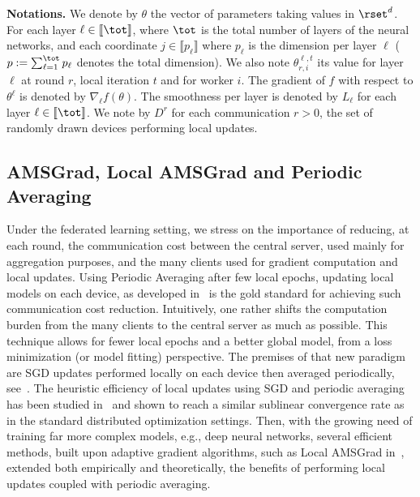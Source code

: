 \documentclass[twoside]{article}
\begin{document}
\noindent\textbf{Notations.} We denote by $\theta$ the vector of parameters taking values in $\rset^d$. 
For each layer $\ell \in \llbracket \tot \rrbracket$, where $\tot$ is the total number of layers of the neural networks, and each coordinate $j \in \llbracket p_\ell \rrbracket$ where $p_\ell$ is the dimension per layer $\ell$ ($p := \sum_{\ell=1}^\tot p_\ell$ denotes the total dimension).
We also note $\theta_{r,i}^{\ell,t}$ its value for layer $\ell$ at round $r$, local iteration $t$ and for worker $i$.
The gradient of $f$ with respect to $\theta^\ell$ is denoted by $\nabla_{\ell} f(\theta)$.
The smoothness per layer is denoted by $L_\ell$ for each layer $\ell \in \llbracket \tot \rrbracket$.
We note by $D^{r}$ for each communication $r>0$, the set of randomly drawn devices performing local updates.


\subsection{AMSGrad, Local AMSGrad and Periodic Averaging}
Under the federated learning setting, we stress on the importance of reducing, at each round, the communication cost between the central server, used mainly for aggregation purposes, and the many clients used for gradient computation and local updates.
Using Periodic Averaging after few local epochs, updating local models on each device, as developed in~\citet{mcmahan2017communication} is the gold standard for achieving such communication cost reduction.
Intuitively, one rather shifts the computation burden from the many clients to the central server as much as possible. 
This technique allows for fewer local epochs and a better global model, from a loss minimization (or model fitting) perspective.
The premises of that new paradigm are SGD updates performed locally on each device then averaged periodically, see~\citet{konevcny2016federated, zhou2017convergence}.
The heuristic efficiency of local updates using SGD and periodic averaging has been studied in~\citet{stich2018local,yu2019linear} and shown to reach a similar sublinear convergence rate as in the standard distributed optimization settings.
Then, with the growing need of training far more complex models, e.g., deep neural networks, several efficient methods, built upon adaptive gradient algorithms, such as Local AMSGrad in~\citet{chen2020toward}, extended both empirically and theoretically, the benefits of performing local updates coupled with periodic averaging.
\end{document}
